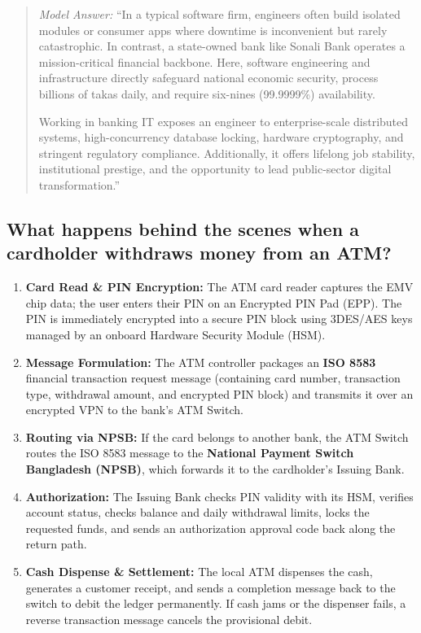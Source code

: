 \begin{quote}
\textit{Model Answer:}
``In a typical software firm, engineers often build isolated modules or consumer apps where downtime is inconvenient but rarely catastrophic. In contrast, a state-owned bank like Sonali Bank operates a mission-critical financial backbone. Here, software engineering and infrastructure directly safeguard national economic security, process billions of takas daily, and require six-nines (99.9999\%) availability. 

Working in banking IT exposes an engineer to enterprise-scale distributed systems, high-concurrency database locking, hardware cryptography, and stringent regulatory compliance. Additionally, it offers lifelong job stability, institutional prestige, and the opportunity to lead public-sector digital transformation.''
\end{quote}

\medskip

\subsection{What happens behind the scenes when a cardholder withdraws money from an ATM?}

\begin{enumerate}
  \item \textbf{Card Read \& PIN Encryption:} The ATM card reader captures the EMV chip data; the user enters their PIN on an Encrypted PIN Pad (EPP). The PIN is immediately encrypted into a secure PIN block using 3DES/AES keys managed by an onboard Hardware Security Module (HSM).
  \item \textbf{Message Formulation:} The ATM controller packages an \textbf{ISO 8583} financial transaction request message (containing card number, transaction type, withdrawal amount, and encrypted PIN block) and transmits it over an encrypted VPN to the bank's ATM Switch.
  \item \textbf{Routing via NPSB:} If the card belongs to another bank, the ATM Switch routes the ISO 8583 message to the \textbf{National Payment Switch Bangladesh (NPSB)}, which forwards it to the cardholder's Issuing Bank.
  \item \textbf{Authorization:} The Issuing Bank checks PIN validity with its HSM, verifies account status, checks balance and daily withdrawal limits, locks the requested funds, and sends an authorization approval code back along the return path.
  \item \textbf{Cash Dispense \& Settlement:} The local ATM dispenses the cash, generates a customer receipt, and sends a completion message back to the switch to debit the ledger permanently. If cash jams or the dispenser fails, a reverse transaction message cancels the provisional debit.
\end{enumerate}

